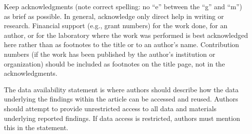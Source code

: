 \documentclass{ametsocV5}
\begin{document}


\acknowledgments
Keep acknowledgments (note correct spelling: no ``e'' between the ``g'' and
``m'') as brief as possible. In general, acknowledge only direct help in
writing or research. Financial support (e.g., grant numbers) for the work
done, for an author, or for the laboratory where the work was performed is
best acknowledged here rather than as footnotes to the title or to an
author's name. Contribution numbers (if the work has been published by the
author's institution or organization) should be included as footnotes on the title page,
not in the acknowledgments.

% 
%
\datastatement
The data availability statement is where authors should describe how the data underlying 
the findings within the article can be accessed and reused. Authors should attempt to 
provide unrestricted access to all data and materials underlying reported findings. 
If data access is restricted, authors must mention this in the statement.

%




\end{document}
